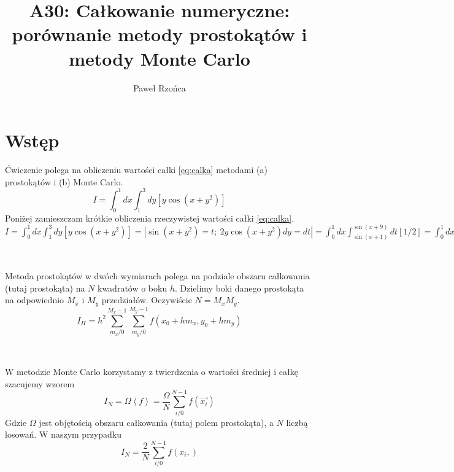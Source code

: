 \documentclass[11pt]{article}
\title{A30: Całkowanie numeryczne: porównanie metody prostokątów i
metody Monte Carlo}
\author{Paweł Rzońca}
\begin{document}
\maketitle

\section*{Wstęp}

Ćwiczenie polega na obliczeniu wartości całki \ref{eq:calka} metodami (a) prostokątów i (b) Monte Carlo.
\begin{equation}\label{eq:calka}
	I = \int_0^1dx\int_1^3dy[y\cos(x+y^2)]
\end{equation}
Poniżej zamieszczam krótkie obliczenia rzeczywistej wartości całki \ref{eq:calka}. \\
$	I = \int_0^1dx\int_1^3dy[y\cos(x+y^2)] = | \sin(x+y^2)=t;\ 2y\cos(x+y^2)dy=dt | = \int_0^1dx\int_{\sin(x+1)}^{\sin(x+9)}dt [1/2]=
	\int_0^1dx [\sin(x+9)-\sin(x+1)]/2 =(1/2) [\cos(x+1)-\cos(x+9)]|_0^1 = (1/2)[\cos(2)-\cos(10)-\cos(1)+\cos(9)] . $

$ $

Metoda prostokątów w dwóch wymiarach polega na podziale obszaru całkowania (tutaj prostokąta) na $N$ kwadratów o boku $h$. Dzielimy boki danego
prostokąta na odpowiednio $M_x$ i $M_y$ przedziałów. Oczywiście $N=M_xM_y$.
\begin{equation}
	I_H = h^2\sum_{m_x/0}^{M_x-1}\sum_{m_y/0}^{M_y-1}f(x_0+hm_x,y_0+hm_y)
\end{equation}

$ $

W metodzie Monte Carlo korzystamy z twierdzenia o wartości średniej i całkę szacujemy wzorem
\begin{equation}
	I_N =\Omega \left< f \right> =  \frac{\Omega}{N}\sum_{i/0}^{N-1} f(\vec{x_i})
\end{equation}
Gdzie $\Omega$ jest objętością obszaru całkowania (tutaj polem prostokąta), a $N$ liczbą losowań. W naszym przypadku
\begin{equation}
	I_N = \frac{2}{N}\sum_{i/0}^{N-1} f(x_i,)
\end{equation}
\end{document}
